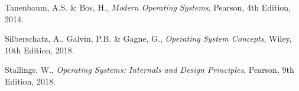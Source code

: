 \documentclass[12pt,a4paper]{article}
\begin{document}

\begin{thebibliography}{9}

  Tanenbaum, A.S. \& Bos, H.,
  \textit{Modern Operating Systems},
  Pearson, 4th Edition, 2014.

  Silberschatz, A., Galvin, P.B. \& Gagne, G.,
  \textit{Operating System Concepts},
  Wiley, 10th Edition, 2018.

  Stallings, W.,
  \textit{Operating Systems: Internals and Design Principles},
  Pearson, 9th Edition, 2018.

\end{thebibliography}
\end{document}
